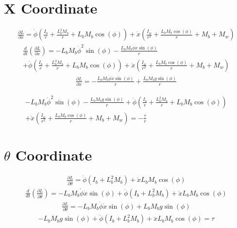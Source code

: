 \documentclass[12pt]{article}
\begin{document}
\section*{X Coordinate}
\begin{multline*}
\frac{\partial L}{\partial \dot{x}}= \dot{\phi} \left(\frac{I_{b}}{r} + \frac{L_{b}^{2} M_{b}}{r} + L_{b} M_{b} \cos{\left(\phi \right)}\right) + \dot{x} \left(\frac{I_{w}}{r^{2}} + \frac{L_{b} M_{b} \cos{\left(\phi \right)}}{r} + M_{b} + M_{w}\right)
\end{multline*}
\begin{multline*}
\frac{d}{dt}(\frac{\partial L}{\partial \dot{x}})= - L_{b} M_{b} \dot{\phi}^{2} \sin{\left(\phi \right)} - \frac{L_{b} M_{b} \dot{\phi} \dot{x} \sin{\left(\phi \right)}}{r} \\
+ \ddot{\phi} \left(\frac{I_{b}}{r} + \frac{L_{b}^{2} M_{b}}{r} + L_{b} M_{b} \cos{\left(\phi \right)}\right) + \ddot{x} \left(\frac{I_{w}}{r^{2}} + \frac{L_{b} M_{b} \cos{\left(\phi \right)}}{r} + M_{b} + M_{w}\right)
\end{multline*}
\begin{multline*}
\frac{\partial L}{\partial x}= - \frac{L_{b} M_{b} \dot{\phi} \dot{x} \sin{\left(\phi \right)}}{r} + \frac{L_{b} M_{b} g \sin{\left(\phi \right)}}{r}
\end{multline*}

\begin{multline*}
- L_{b} M_{b} \dot{\phi}^{2} \sin{\left(\phi \right)} - \frac{L_{b} M_{b} g \sin{\left(\phi \right)}}{r} + \ddot{\phi} \left(\frac{I_{b}}{r} + \frac{L_{b}^{2} M_{b}}{r} + L_{b} M_{b} \cos{\left(\phi \right)}\right)\\
+ \ddot{x} \left(\frac{I_{w}}{r^{2}} + \frac{L_{b} M_{b} \cos{\left(\phi \right)}}{r} + M_{b} + M_{w}\right)=-\frac{\tau}{r}
\end{multline*}

\section*{$\theta$ Coordinate}
\begin{multline*}
\frac{\partial L}{\partial \dot{\theta}}= \dot{\phi} \left(I_{b} + L_{b}^{2} M_{b}\right) + \dot{x} L_{b} M_{b} \cos{\left(\phi \right)}
\end{multline*}
\begin{multline*}
\frac{d}{dt}(\frac{\partial L}{\partial \dot{\theta}})= - L_{b} M_{b} \dot{\phi} \dot{x} \sin{\left(\phi \right)} + \ddot{\phi} \left(I_{b} + L_{b}^{2} M_{b}\right) + \ddot{x} L_{b} M_{b} \cos{\left(\phi \right)}
\end{multline*}
\begin{multline*}
\frac{\partial L}{\partial \theta}= - L_{b} M_{b} \dot{\phi} \dot{x} \sin{\left(\phi \right)} + L_{b} M_{b} g \sin{\left(\phi \right)}
\end{multline*}
\begin{multline*}
- L_{b} M_{b} g \sin{\left(\phi \right)} + \ddot{\phi} \left(I_{b} + L_{b}^{2} M_{b}\right) + \ddot{x}L_{b} M_{b} \cos{\left(\phi \right)}=\tau
\end{multline*}
\end{document}
